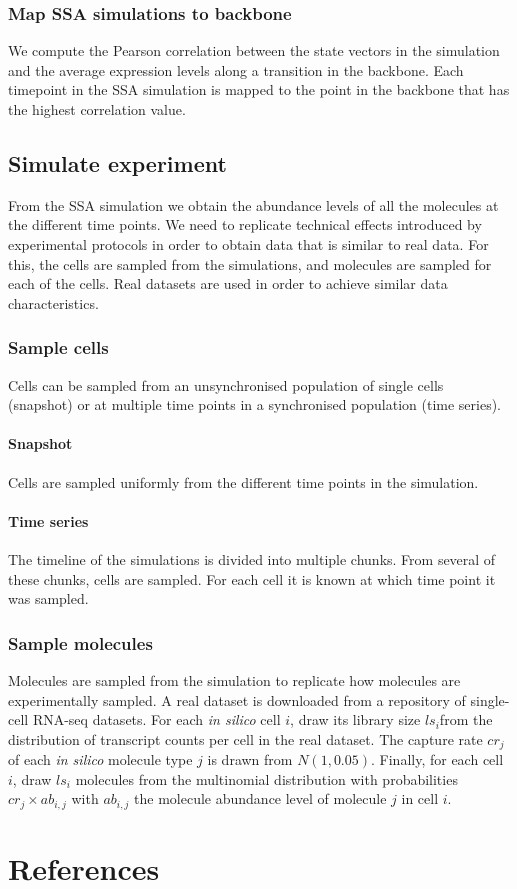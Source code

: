 \subsubsection{Map SSA simulations to backbone}
We compute the Pearson correlation between the state vectors in the simulation and the average expression levels along a transition in the backbone. Each timepoint in the SSA simulation is mapped to the point in the backbone that has the highest correlation value.

\subsection{Simulate experiment}
From the SSA simulation we obtain the abundance levels of all the molecules at the different time points. We need to replicate technical effects introduced by experimental protocols in order to obtain data that is similar to real data. For this, the cells are sampled from the simulations, and molecules are sampled for each of the cells. Real datasets are used in order to achieve similar data characteristics.

\subsubsection{Sample cells}
Cells can be sampled from an unsynchronised population of single cells (snapshot) or at multiple time points in a synchronised population (time series).

\paragraph{Snapshot} Cells are sampled uniformly from the different time points in the simulation.

\paragraph{Time series} The timeline of the simulations is divided into multiple chunks. From several of these chunks, cells are sampled. For each cell it is known at which time point it was sampled.

\subsubsection{Sample molecules} 
Molecules are sampled from the simulation to replicate how molecules are experimentally sampled. A real dataset is downloaded from a repository of single-cell RNA-seq datasets\cite{cannoodt_singlecellomicsdatasets_2018}. For each \textit{in silico} cell $i$, draw its library size $ls_i$from the distribution of transcript counts per cell in the real dataset. The capture rate $cr_j$ of each \textit{in silico} molecule type $j$ is drawn from $N(1, 0.05)$. Finally, for each cell $i$, draw $ls_i$ molecules from the multinomial distribution with probabilities $cr_j \times ab_{i,j}$ with $ab_{i,j}$ the molecule abundance level of molecule $j$ in cell $i$.


\clearpage
\section{References}
\printbibliography[heading=none]